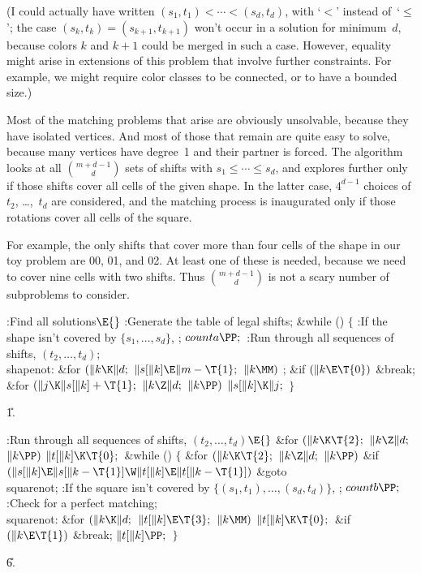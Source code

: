 (I could actually have written $(s_1,t_1)<\cdots<(s_d,t_d)$,
with `$<$' instead of~`$\le$';
the case $(s_k,t_k)=(s_{k+1},t_{k+1})$ won't occur in a solution
for minimum~$d$, because colors $k$ and $k+1$ could be merged in such
a case. However, equality might arise in
extensions of this problem that involve further constraints.
For example, we might
require color classes to be connected, or to have a bounded size.)

Most of the matching problems that arise are obviously unsolvable,
because they have isolated vertices. And most of those that
remain are quite easy to solve, because many vertices have degree~1
and their partner is forced. The algorithm looks at all $m+d-1\choose d$
sets of shifts with $s_1\le\cdots\le s_d$, and explores further only if those
shifts cover all cells of the given shape. In the latter case,
$4^{d-1}$ choices of $t_2$, \dots,~$t_d$ are considered, and the
matching process is inaugurated only if those rotations cover
all cells of the square.

For example, the only shifts that cover more than four cells of the shape
in our toy problem are 00, 01, and 02. At least one of these is needed, because
we need to cover nine cells with two shifts. Thus $m+d-1\choose d$ is
not a scary number of subproblems to consider.

\Y\B\4:Find all solutions\X${}\E{}$\6
:Generate the table of legal shifts\X;\6
\&{while} ()\5
${}\{{}$\1\6
:If the shape isn't covered by $\{s_1,\ldots,s_d\}$, \X;\6
${}\\{counta}\PP;{}$\6
:Run through all sequences of shifts, $(t_2,\ldots,t_d)$\X;\6
\4\\{shapenot}:\5
\&{for} ${}(\|k\K\|d;{}$ ${}\|s[\|k]\E\|m-\T{1};{}$ ${}\|k\MM){}$\1\5
;\2\6
\&{if} ${}(\|k\E\T{0}){}$\1\5
\&{break};\2\6
\&{for} ${}(\|j\K\|s[\|k]+\T{1};{}$ ${}\|k\Z\|d;{}$ ${}\|k\PP){}$\1\5
${}\|s[\|k]\K\|j;{}$\2\6
\4${}\}{}$\2\par
\U1.\fi

\B{}:Run through all sequences of shifts, $(t_2,%
\ldots,t_d)$\X${}\E{}$\6
\&{for} ${}(\|k\K\T{2};{}$ ${}\|k\Z\|d;{}$ ${}\|k\PP){}$\1\5
${}\|t[\|k]\K\T{0};{}$\2\6
\&{while} ()\5
${}\{{}$\1\6
\&{for} ${}(\|k\K\T{2};{}$ ${}\|k\Z\|d;{}$ ${}\|k\PP){}$\1\6
\&{if} ${}(\|s[\|k]\E\|s[\|k-\T{1}]\W\|t[\|k]\E\|t[\|k-\T{1}]){}$\1\5
\&{goto} \\{squarenot};\2\2\6
:If the square isn't covered by $\{(s_1,t_1),\ldots,(s_d,t_d)\}$, \X;\6
${}\\{countb}\PP;{}$\6
:Check for a perfect matching\X;\6
\4\\{squarenot}:\5
\&{for} ${}(\|k\K\|d;{}$ ${}\|t[\|k]\E\T{3};{}$ ${}\|k\MM){}$\1\5
${}\|t[\|k]\K\T{0};{}$\2\6
\&{if} ${}(\|k\E\T{1}){}$\1\5
\&{break};\2\6
${}\|t[\|k]\PP;{}$\6
\4${}\}{}$\2\par
\U6.\fi

